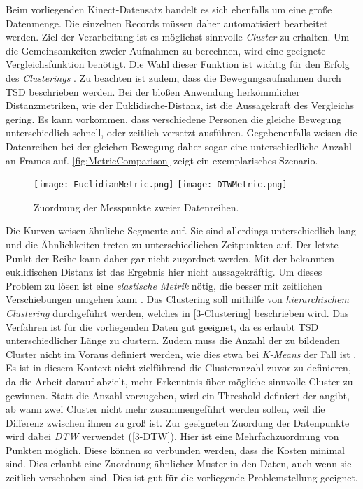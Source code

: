 Beim vorliegenden Kinect-Datensatz handelt es sich ebenfalls um eine große Datenmenge.
Die einzelnen Records müssen daher automatisiert bearbeitet werden.
Ziel der Verarbeitung ist es möglichst sinnvolle \emph{Cluster} zu erhalten.
Um die Gemeinsamkeiten zweier Aufnahmen zu berechnen,
wird eine geeignete Vergleichsfunktion benötigt.
Die Wahl dieser Funktion ist wichtig für den Erfolg des \emph{Clusterings} \citep{warren_liao_clustering_2005}.
Zu beachten ist zudem, dass die Bewegungsaufnahmen durch \ac{TSD} beschrieben werden.
Bei der bloßen Anwendung herkömmlicher Distanzmetriken, wie der Euklidische-Distanz,
ist die Aussagekraft des Vergleichs gering.
Es kann vorkommen, dass verschiedene Personen die gleiche Bewegung unterschiedlich schnell,
oder zeitlich versetzt ausführen.
Gegebenenfalls weisen die Datenreihen bei der gleichen Bewegung daher sogar eine unterschiedliche Anzahl an Frames auf.
\autoref{fig:MetricComparison} zeigt ein exemplarisches Szenario.
\begin{figure}[ht]
    \begin{center}
    \texttt{[image: EuclidianMetric.png]}
    \texttt{[image: DTWMetric.png]}
    \end{center}
    \caption{Zuordnung der Messpunkte zweier Datenreihen.}
    \label{fig:MetricComparison}
\end{figure}
Die Kurven weisen ähnliche Segmente auf.
Sie sind allerdings unterschiedlich lang und die Ähnlichkeiten treten zu unterschiedlichen Zeitpunkten auf.
Der letzte Punkt der Reihe kann daher gar nicht zugordnet werden.
Mit der bekannten euklidischen Distanz ist das Ergebnis hier nicht aussagekräftig.
Um dieses Problem zu lösen ist eine \emph{elastische Metrik} nötig,
die besser mit zeitlichen Verschiebungen umgehen kann \citep{aghabozorgi_time-series_2015}.
Das Clustering soll mithilfe von \emph{hierarchischem Clustering} durchgeführt werden,
welches in \autoref{3-Clustering} beschrieben wird.
Das Verfahren ist für die vorliegenden Daten gut geeignet,
da es erlaubt \ac{TSD} unterschiedlicher Länge zu clustern.
Zudem muss die Anzahl der zu bildenden Cluster nicht im Voraus definiert werden,
wie dies etwa bei \emph{K-Means} der Fall ist \citep{aghabozorgi_time-series_2015}.
Es ist in diesem Kontext nicht zielführend die Clusteranzahl zuvor zu definieren,
da die Arbeit darauf abzielt, mehr Erkenntnis über mögliche sinnvolle Cluster zu gewinnen.
Statt die Anzahl vorzugeben, wird ein Threshold definiert der angibt,
ab wann zwei Cluster nicht mehr zusammengeführt werden sollen,
weil die Differenz zwischen ihnen zu groß ist.
Zur geeigneten Zuordung der Datenpunkte wird dabei \emph{\ac{DTW}} verwendet (\autoref{3-DTW}).
Hier ist eine Mehrfachzuordnung von Punkten möglich.
Diese können so verbunden werden, dass die Kosten minimal sind.
Dies erlaubt eine Zuordnung ähnlicher Muster in den Daten, auch wenn sie zeitlich verschoben sind.
Dies ist gut für die vorliegende Problemstellung geeignet.